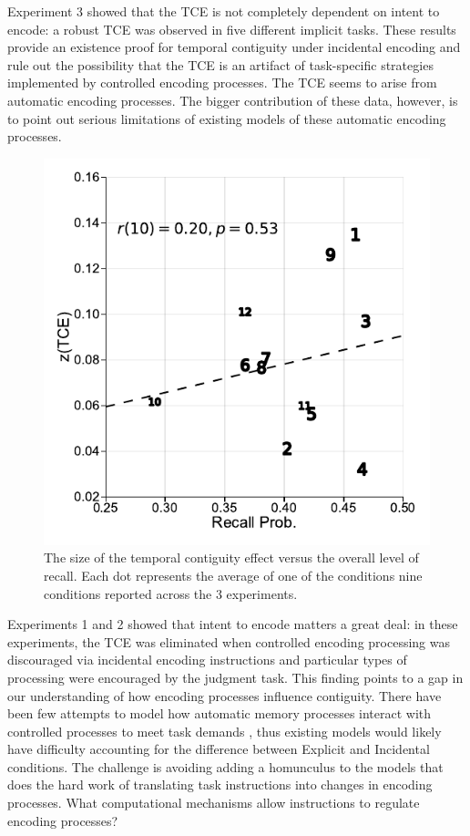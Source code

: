 \documentclass[jou,natbib,floatsintext]{apa6} %
\begin{document}
Experiment 3 showed that the TCE is not completely dependent on intent to encode: a robust TCE was observed in five different implicit tasks. These results provide an existence proof for temporal contiguity under incidental encoding and rule out the possibility that the TCE is an artifact of task-specific strategies implemented by controlled encoding processes. The TCE seems to arise from automatic encoding processes. The bigger contribution of these data, however, is to point out serious limitations of existing models of these automatic encoding processes. 


\begin{figure}%
\includegraphics{figures/correlation.pdf}
\caption{The size of the temporal contiguity effect versus the overall level of recall. Each dot represents the average of one of the conditions nine conditions reported across the 3 experiments.}
\label{corr}
\end{figure}

Experiments 1 and 2 showed that intent to encode matters a great deal: in these experiments, the TCE was eliminated when controlled encoding processing was discouraged via incidental encoding instructions and particular types of processing were encouraged by the judgment task. This finding points to a gap in our understanding of how encoding processes influence contiguity. There have been few attempts to model how automatic memory processes interact with controlled processes to meet task demands \citep{LehmMalm13,PolyEtal09}, thus existing models would likely have difficulty accounting for the difference between Explicit and Incidental conditions. The challenge is avoiding adding a homunculus to the models that does the hard work of translating task instructions into changes in encoding processes. What computational mechanisms allow instructions to regulate encoding processes?
\end{document}
